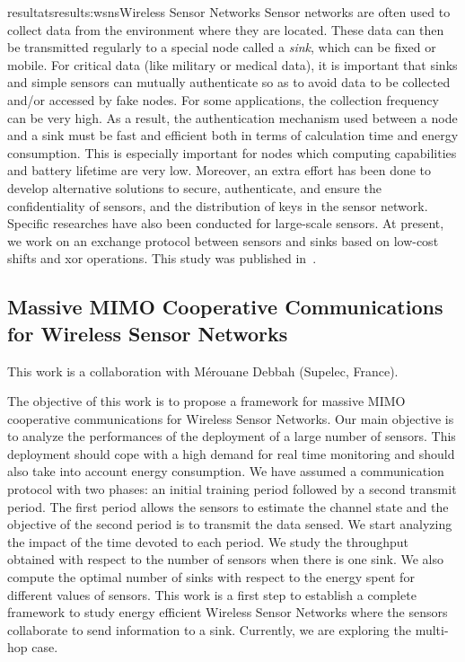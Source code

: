\documentclass{ra2016}
\begin{document}
\begin{module}{resultats}{results:wsns}{Wireless Sensor Networks}
Sensor networks are often used to collect data from the environment where they are located. These data can then be transmitted regularly to a special node called a {\em sink}, which can be fixed or mobile. For critical data (like military or medical data), it is important that sinks and simple sensors can mutually authenticate so as to avoid data to be collected and/or accessed by fake nodes.
For some applications, the collection frequency can be very high. As a result, the authentication mechanism used between a node and a sink must be fast and efficient both in terms of calculation time and energy consumption. This is especially important for nodes which computing capabilities and battery lifetime are very low. Moreover, an extra effort has been done to develop alternative solutions to secure, authenticate, and ensure the confidentiality of sensors, and the distribution of keys in the sensor network. Specific researches have also been conducted for large-scale sensors. At present, we work on an exchange protocol between sensors and sinks based on low-cost shifts and xor operations. This study was published in~\cite{boumerdassi:hal-01251917}. 

\subsection{Massive MIMO Cooperative Communications for Wireless Sensor Networks}

\begin{participants}
\end{participants}

This work is a collaboration with M\'erouane Debbah (Supelec, France).

The objective of this work is to propose a framework for massive MIMO cooperative communications for Wireless Sensor Networks. Our main objective is  to analyze the performances of the deployment of a large number of sensors. This deployment should cope with a high demand for real time monitoring and should also take into account energy consumption. We have assumed a communication protocol with two phases: an initial training period followed by a second transmit period. The first period allows the sensors to estimate the channel state and the objective of the second period is to transmit the data sensed. We start analyzing the impact of the time devoted to each period. We study the throughput obtained with respect to the number of sensors when there is one sink. We also compute the optimal number of sinks with respect to the energy spent for different values of sensors. This work is a first step to establish a complete framework to study energy efficient Wireless Sensor Networks where the sensors collaborate to send information to a sink. Currently, we are exploring the multi-hop case.

\end{module}
\end{document}
